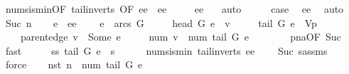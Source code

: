 \begin{isabellebody}
\ num{\isacharunderscore}s{\isacharunderscore}is{\isacharunderscore}min{\isacharbrackleft}OF\ tail{\isacharunderscore}in{\isacharunderscore}verts\ {\isacharbrackleft}OF\ ee{\isacharparenleft}{}{\isacharparenright}{\isacharbrackright}\ {\isacharunderscore}\ ee{\isacharparenleft}{}{\isacharparenright}{\isacharbrackright}\ \isanewline
\ \ \ \ ee{\isacharparenleft}{}{\isacharparenright}\ {}{\isacharparenleft}{}{\isacharparenright}\ \isamarkupfalse%
\ auto\isanewline
\ \ \isamarkupfalse%
\ \isamarkupfalse%
\ {\isacharquery}case\ \isamarkupfalse%
\ ee\ \isamarkupfalse%
\ auto\isanewline
{}\isamarkupfalse%
\isanewline
{}\isamarkupfalse%
\ {\isacharparenleft}Suc\ n{\isacharprime}{\isacharparenright}\isanewline
\ \ \isamarkupfalse%
\ e\ \ ee{\isacharcolon}\isanewline
\ \ \ \ {\isachardoublequoteopen}e\ {\isasymin}\ arcs\ G{\isachardoublequoteclose}\ \isanewline
\ \ \ \ {\isachardoublequoteopen}head\ G\ e\ {\isacharequal}\ v{\isachardoublequoteclose}\ \isanewline
\ \ \ \ {\isachardoublequoteopen}{\isacharparenleft}tail\ G\ e{\isacharparenright}\ {\isasymnotin}\ V\isactrlsub p{\isachardoublequoteclose}\ \isanewline
\ \ \ \ {\isachardoublequoteopen}parent{\isacharunderscore}edge\ v\ {\isacharequal}\ Some\ e{\isachardoublequoteclose}\ \isanewline
\ \ \ \ {\isachardoublequoteopen}num\ v\ {\isacharequal}\ num\ {\isacharparenleft}tail\ G\ e{\isacharparenright}\ {\isacharplus}\ {}{\isachardoublequoteclose}\isanewline
\ \ \ \ \isamarkupfalse%
\ pna{\isacharbrackleft}OF\ Suc{\isacharparenleft}{}{\isacharminus}{}{\isacharparenright}{\isacharbrackright}\ \isamarkupfalse%
\ fast\isanewline
\ \ \isamarkupfalse%
\ \isamarkupfalse%
\ ss{\isacharcolon}\ {\isachardoublequoteopen}tail\ G\ e\ {\isasymnoteq}\ s{\isachardoublequoteclose}\isanewline
\ \ \ \ \isamarkupfalse%
\ num{\isacharunderscore}s{\isacharunderscore}is{\isacharunderscore}min\ tail{\isacharunderscore}in{\isacharunderscore}verts\ ee\isanewline
\ \ \ \ Suc{\isacharparenleft}{}{\isacharparenright}\ s{\isacharunderscore}assms{\isacharparenleft}{}{\isacharparenright}\ \isamarkupfalse%
\ force\isanewline
\ \ \isamarkupfalse%
\ nst{\isacharcolon}\ {\isachardoublequoteopen}n{\isacharprime}\ {\isacharequal}\ num\ {\isacharparenleft}tail\ G\ e{\isacharparenright}\ {\isacharminus}\ {}{\isachardoublequoteclose}\isanewline

\end{isabellebody}
